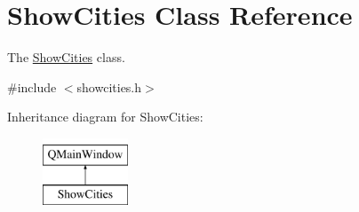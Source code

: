 \hypertarget{class_show_cities}{}\section{Show\+Cities Class Reference}
\label{class_show_cities}


The \mbox{\hyperlink{class_show_cities}{Show\+Cities}} class.  




{\ttfamily \#include $<$showcities.\+h$>$}

Inheritance diagram for Show\+Cities\+:\begin{figure}[H]
\begin{center}
\leavevmode
\includegraphics[height=2.000000cm]{class_show_cities}
\end{center}
\end{figure}
